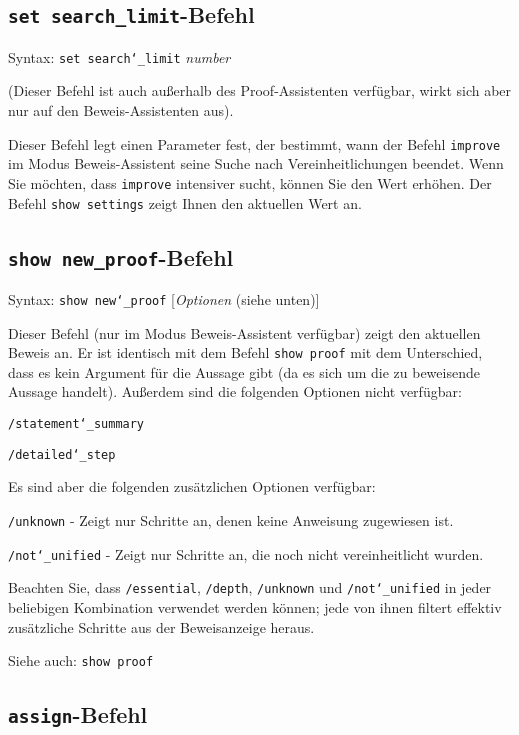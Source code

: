 \subsection{\texttt{set search\_limit}-Befehl}

Syntax:  \texttt{set search{\char`\_}limit} {\em number}

(Dieser Befehl ist auch außerhalb des Proof-Assistenten verfügbar, wirkt sich aber nur auf den Beweis-Assistenten aus).

Dieser Befehl legt einen Parameter fest, der bestimmt, wann der Befehl \texttt{improve} im Modus Beweis-Assistent seine Suche nach Vereinheitlichungen beendet.  Wenn Sie möchten, dass \texttt{improve} intensiver sucht, können Sie den Wert erhöhen.  Der Befehl \texttt{show settings} zeigt Ihnen den aktuellen Wert an.


\subsection{\texttt{show new\_proof}-Befehl}

Syntax:  \texttt{show new{\char`\_}proof} [{\em Optionen} (siehe unten)]

Dieser Befehl (nur im Modus Beweis-Assistent verfügbar) zeigt den aktuellen Beweis an.  Er ist identisch mit dem Befehl \texttt{show proof} mit dem Unterschied, dass es kein Argument für die Aussage gibt (da es sich um die zu beweisende Aussage handelt). Außerdem sind die folgenden Optionen nicht verfügbar:

    \texttt{/statement{\char`\_}summary}

    \texttt{/detailed{\char`\_}step}

Es sind aber die folgenden zusätzlichen Optionen verfügbar:

    \texttt{/unknown} - Zeigt nur Schritte an, denen keine Anweisung zugewiesen ist.

    \texttt{/not{\char`\_}unified} - Zeigt nur Schritte an, die noch nicht vereinheitlicht wurden.

Beachten Sie, dass \texttt{/essential}, \texttt{/depth}, \texttt{/unknown} und \texttt{/not{\char`\_}unified} in jeder beliebigen Kombination verwendet werden können; jede von ihnen filtert effektiv zusätzliche Schritte aus der Beweisanzeige heraus.

Siehe auch:  \texttt{show proof}


\subsection{\texttt{assign}-Befehl}

